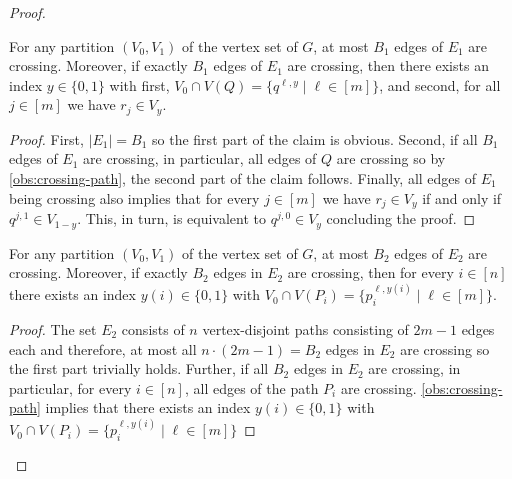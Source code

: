 \documentclass[a4paper,UKenglish,cleveref, autoref, thm-restate]{lipics-v2021}
\begin{document}
\begin{proof}
    \begin{claim}\label{claim:e-1-edges}
        For any partition $(V_0, V_1)$ of the vertex set of $G$, at most $B_1$ edges of $E_1$ are crossing. 
        Moreover, if exactly $B_1$ edges of $E_1$ are crossing, then there exists an index $y \in \{0, 1\}$ with first, $V_0 \cap V(Q) = \{q^{\ell, y} \mid \ell \in [m]\}$, and second, for all $j \in [m]$ we have $r_j \in V_y$.
    \end{claim}

    \begin{proof}
        First, $|E_1| = B_1$ so the first part of the claim is obvious.
        Second, if all $B_1$ edges of $E_1$ are crossing, in particular, all edges of $Q$ are crossing so by \cref{obs:crossing-path}, the second part of the claim follows. 
        Finally, all edges of $E_1$ being crossing also implies that for every $j \in [m]$ we have $r_j \in V_y$ if and only if $q^{j,1} \in V_{1-y}$.
        This, in turn, is equivalent to $q^{j,0} \in V_{y}$ concluding the proof.
    \end{proof}

    \begin{claim}\label{claim:e-2-edges}
         For any partition $(V_0, V_1)$ of the vertex set of $G$, at most $B_2$ edges of $E_2$ are crossing. 
         Moreover, if exactly $B_2$ edges in $E_2$ are crossing, then for every $i \in [n]$ there exists an index $y(i) \in \{0, 1\}$ with $V_0 \cap V(P_i) = \{p_i^{\ell, y(i)} \mid \ell \in [m]\}$.
    \end{claim}

    \begin{proof}
        The set $E_2$ consists of $n$ vertex-disjoint paths consisting of $2m-1$ edges each and therefore, at most all $n \cdot (2m-1) = B_2$ edges in $E_2$ are crossing so the first part trivially holds.
        Further, if all $B_2$ edges in $E_2$ are crossing, in particular, for every $i \in [n]$, all edges of the path $P_i$ are crossing.       
        \cref{obs:crossing-path} implies that there exists an index $y(i) \in \{0,1\}$ with $V_0 \cap V(P_i) = \{p_i^{\ell, y(i)} \mid \ell \in [m]\}$
    \end{proof}


\end{proof}
\end{document}
